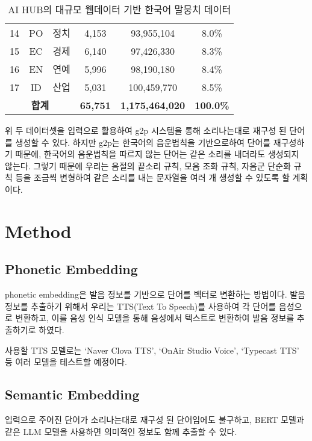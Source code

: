 \documentclass[11pt]{article}
\begin{document}
\begin{table}[h]
\begin{tabular}{cccccc}
        14                              & PO              & 정치                     & 4,153            & 93,955,104    & 8.0\%       \\
        15                              & EC              & 경제                     & 6,140            & 97,426,330    & 8.3\%       \\
        16                              & EN              & 연예                     & 5,996            & 98,190,180    & 8.4\%       \\
        17                              & ID              & 산업                     & 5,031            & 100,459,770   & 8.5\%       \\
        \multicolumn{3}{c}{\textbf{합계}} & \textbf{65,751} & \textbf{1,175,464,020} & \textbf{100.0\%}
    \end{tabular}
    \caption{AI HUB의 대규모 웹데이터 기반 한국어 말뭉치 데이터}
    \label{tab:aihub2}
\end{table}

위 두 데이터셋을 입력으로 활용하여 g2p 시스템을 통해 소리나는대로 재구성 된 단어를 생성할 수 있다.
하지만 g2p는 한국어의 음운법칙을 기반으로하여 단어를 재구성하기 때문에, 한국어의 음운법칙을 따르지 않는 단어는 같은 소리를 내더라도 생성되지 않는다.
그렇기 때문에 우리는 음절의 끝소리 규칙, 모음 조화 규칙, 자음군 단순화 규칙 등을 조금씩 변형하여 같은 소리를 내는 문자열을 여러 개 생성할 수 있도록 할 계획이다.

\section{Method}
\subsection{Phonetic Embedding}
phonetic embedding은 발음 정보를 기반으로 단어를 벡터로 변환하는 방법이다. 발음 정보를 추출하기 위해서 우리는 TTS(Text To Speech)를 사용하여 각 단어를 음성으로 변환하고, 이를 음성 인식 모델을 통해 음성에서 텍스트로 변환하여 발음 정보를 추출하기로 하였다.

사용할 TTS 모델로는 `Naver Clova TTS', `OnAir Studio Voice', `Typecast TTS' 등 여러 모델을 테스트할 예정이다.
\subsection{Semantic Embedding}
입력으로 주어진 단어가 소리나는대로 재구성 된 단어임에도 불구하고, BERT 모델과 같은 LLM 모델을 사용하면 의미적인 정보도 함께 추출할 수 있다.
\end{document}
